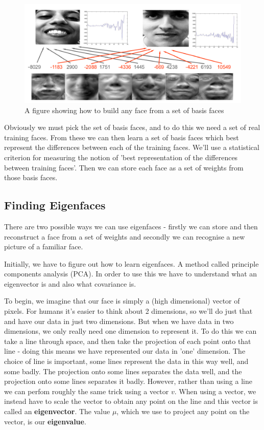 \documentclass{article}
\begin{document}
	\begin{figure}[h]
		\centering
		\includegraphics[width=\textwidth]{eigenfaces}
		\caption{A figure showing how to build any face from a set of basis faces}
		\label{fig:eigenfaces}
	\end{figure}
	
	Obviously we must pick the set of basis faces, and to do this we need a set of real training faces. From these we can then learn a set of basis faces which best represent the differences between each of the training faces. We'll use a statistical criterion for measuring the notion of 'best representation of the differences between training faces'. Then we can store each face as a set of weights from those basis faces.
	
	\subsection{Finding Eigenfaces}
	There are two possible ways we can use eigenfaces - firstly we can store and then reconstruct a face from a set of weights and secondly we can recognise a new picture of a familiar face.
	
	Initially, we have to figure out how to learn eigenfaces. A method called principle components analysis (PCA). In order to use this we have to understand what an eigenvector is and also what covariance is.
	
	To begin, we imagine that our face is simply a (high dimensional) vector of pixels. For humans it's easier to think about 2 dimensions, so we'll do just that and have our data in just two dimensions. But when we have data in two dimensions, we only really need one dimension to represent it. To do this we can take a line through space, and then take the projection of each point onto that line - doing this means we have represented our data in 'one' dimension. The choice of line is important, some lines represent the data in this way well, and some badly. The projection onto some lines separates the data well, and the projection onto some lines separates it badly. However, rather than using a line we can perfom roughly the same trick using a vector $v$. When using a vector, we instead have to scale the vector to obtain any point on the line and this vector is called an \textbf{eigenvector}. The value $\mu$, which we use to project any point on the vector, is our \textbf{eigenvalue}.
	
\end{document}
